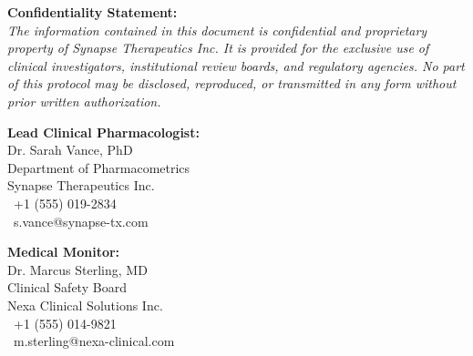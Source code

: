 \vspace{20pt}

\noindent
\begin{tcolorbox}[
  colback=lightbg,
  colframe=bordergray,
  arc=3pt,
  boxrule=0.8pt,
  left=12pt,
  right=12pt,
  top=10pt,
  bottom=10pt
]
  \textbf{\textcolor{primary}{Confidentiality Statement:}} \\
  \small\itshape
  The information contained in this document is confidential and proprietary property of Synapse Therapeutics Inc. It is provided for the exclusive use of clinical investigators, institutional review boards, and regulatory agencies. No part of this protocol may be disclosed, reproduced, or transmitted in any form without prior written authorization.
\end{tcolorbox}

\vspace{15pt}

\noindent
\begin{minipage}[t]{0.48\textwidth}
  \textbf{Lead Clinical Pharmacologist:} \\
  Dr. Sarah Vance, PhD \\
  Department of Pharmacometrics \\
  Synapse Therapeutics Inc. \\
  \faPhone\ +1 (555) 019-2834 \\
  \faEnvelope\ s.vance@synapse-tx.com
\end{minipage}%
\hfill
\begin{minipage}[t]{0.48\textwidth}
  \textbf{Medical Monitor:} \\
  Dr. Marcus Sterling, MD \\
  Clinical Safety Board \\
  Nexa Clinical Solutions Inc. \\
  \faPhone\ +1 (555) 014-9821 \\
  \faEnvelope\ m.sterling@nexa-clinical.com
\end{minipage}

\newpage
